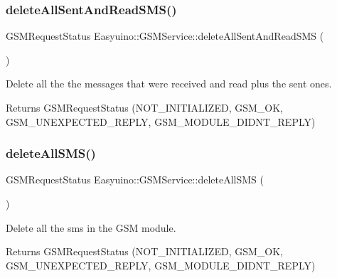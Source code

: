 \subsubsection{\texorpdfstring{delete\+All\+Sent\+And\+Read\+S\+M\+S()}{deleteAllSentAndReadSMS()}}
{\footnotesize\ttfamily G\+S\+M\+Request\+Status Easyuino\+::\+G\+S\+M\+Service\+::delete\+All\+Sent\+And\+Read\+S\+MS (\begin{DoxyParamCaption}{ }\end{DoxyParamCaption})}



Delete all the the messages that were received and read plus the sent ones. 

\begin{DoxyReturn}{Returns}
G\+S\+M\+Request\+Status (N\+O\+T\+\_\+\+I\+N\+I\+T\+I\+A\+L\+I\+Z\+ED, G\+S\+M\+\_\+\+OK, G\+S\+M\+\_\+\+U\+N\+E\+X\+P\+E\+C\+T\+E\+D\+\_\+\+R\+E\+P\+LY, G\+S\+M\+\_\+\+M\+O\+D\+U\+L\+E\+\_\+\+D\+I\+D\+N\+T\+\_\+\+R\+E\+P\+LY) 
\end{DoxyReturn}
\mbox{\label{class_easyuino_1_1_g_s_m_service_aef4379e7c82f275f0af341f79a3b451f}} 
\subsubsection{\texorpdfstring{delete\+All\+S\+M\+S()}{deleteAllSMS()}}
{\footnotesize\ttfamily G\+S\+M\+Request\+Status Easyuino\+::\+G\+S\+M\+Service\+::delete\+All\+S\+MS (\begin{DoxyParamCaption}{ }\end{DoxyParamCaption})}



Delete all the sms in the G\+SM module. 

\begin{DoxyReturn}{Returns}
G\+S\+M\+Request\+Status (N\+O\+T\+\_\+\+I\+N\+I\+T\+I\+A\+L\+I\+Z\+ED, G\+S\+M\+\_\+\+OK, G\+S\+M\+\_\+\+U\+N\+E\+X\+P\+E\+C\+T\+E\+D\+\_\+\+R\+E\+P\+LY, G\+S\+M\+\_\+\+M\+O\+D\+U\+L\+E\+\_\+\+D\+I\+D\+N\+T\+\_\+\+R\+E\+P\+LY) 
\end{DoxyReturn}
\mbox{\label{class_easyuino_1_1_g_s_m_service_a3595ff12b6e3e5854ed48625b2fa457e}} 
